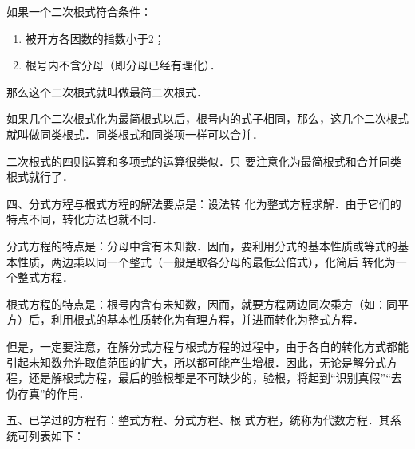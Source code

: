 如果一个二次根式符合条件：
\begin{enumerate}
    \item 被开方各因数的指数小于2；
    \item 根号内不含分母（即分母已经有理化）．
\end{enumerate}
那么这个二次根式就叫做最简二次根式．

如果几个二次根式化为最简根式以后，根号内的式子相同，那么，这几个二次根式就叫做同类根式．同类根式和同类项一样可以合并．

二次根式的四则运算和多项式的运算很类似．只
要注意化为最简根式和合并同类根式就行了．

四、分式方程与根式方程的解法要点是：设法转
化为整式方程求解．由于它们的特点不同，转化方法也就不同．

分式方程的特点是：分母中含有未知数．因而，要利用分式的基本性质或等式的基本性质，两边乘以同一个整式（一般是取各分母的最低公倍式），化简后
转化为一个整式方程．

根式方程的特点是：根号内含有未知数，因而，就要方程两边同次乘方（如：同平方）后，利用根式的基本性质转化为有理方程，并进而转化为整式方程．

但是，一定要注意，在解分式方程与根式方程的过程中，由于各自的转化方式都能引起未知数允许取值范围的扩大，所以都可能产生增根．因此，无论是解分式方程，还是解根式方程，最后的验根都是不可缺少的，验根，将起到“识别真假”“去伪存真”的作用．

五、已学过的方程有：整式方程、分式方程、根
式方程，统称为代数方程．其系统可列表如下：
\begin{center}
\end{center}

